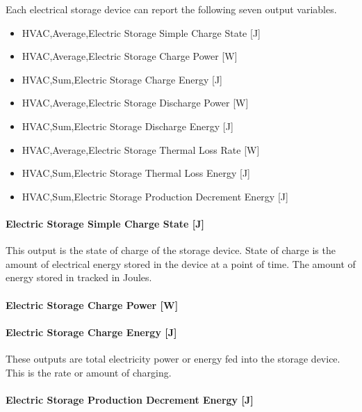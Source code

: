 Each electrical storage device can report the following seven output variables.

\begin{itemize}
\item
  HVAC,Average,Electric Storage Simple Charge State {[}J{]}
\item
  HVAC,Average,Electric Storage Charge Power {[}W{]}
\item
  HVAC,Sum,Electric Storage Charge Energy {[}J{]}
\item
  HVAC,Average,Electric Storage Discharge Power {[}W{]}
\item
  HVAC,Sum,Electric Storage Discharge Energy {[}J{]}
\item
  HVAC,Average,Electric Storage Thermal Loss Rate {[}W{]}
\item
  HVAC,Sum,Electric Storage Thermal Loss Energy {[}J{]}
\item
  HVAC,Sum,Electric Storage Production Decrement Energy {[}J{]}
\end{itemize}

\paragraph{Electric Storage Simple Charge State {[}J{]}}\label{electric-storage-simple-charge-state-j}

This output is the state of charge of the storage device. State of charge is the amount of electrical energy stored in the device at a point of time. The amount of energy stored in tracked in Joules.

\paragraph{Electric Storage Charge Power {[}W{]}}\label{electric-storage-charge-power-w}

\paragraph{Electric Storage Charge Energy {[}J{]}}\label{electric-storage-charge-energy-j}

These outputs are total electricity power or energy fed into the storage device. This is the rate or amount of charging.

\paragraph{Electric Storage Production Decrement Energy {[}J{]}}\label{electric-storage-production-decrement-energy-j}


